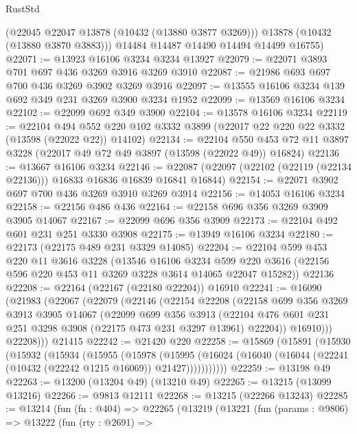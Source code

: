 \begin{lexlean}{RustStd}
\begin{coremodule}
        (@22045 @22047 @13878 (@10432 (@13880 @3877 @3269)))
        @13878
        (@10432 (@13880 @3870 @3883)))
      @14484
      @14487
      @14490
      @14494
      @14499
      @16755)
@22071 := @13923 @16106 @3234 @3234 @13927
@22079 := @22071 @3893 @701 @697 @436 @3269 @3916 @3269 @3910
@22087 := @21986 @693 @697 @700 @436 @3269 @3902 @3269 @3916
@22097 := @13555 @16106 @3234 @139 @692 @349 @231 @3269 @3900 @3234 @1952
@22099 := @13569 @16106 @3234
@22102 := @22099 @692 @349 @3900
@22104 := @13578 @16106 @3234
@22119 := @22104
    @494
    @552
    @220
    @102
    @3332
    @3899
    (@22017 @22 @220 @22 @3332 (@13598 (@22022 @22)) @14102)
@22134 := @22104
    @550
    @453
    @72
    @11
    @3897
    @3228
    (@22017 @49 @72 @49 @3897 (@13598 (@22022 @49)) @16824)
@22136 := @13667 @16106 @3234
@22146 := @22087 (@22097 (@22102 (@22119 (@22134 @22136))) @16833 @16836 @16839 @16841 @16844)
@22154 := @22071 @3902 @697 @700 @436 @3269 @3910 @3269 @3914
@22156 := @14053 @16106 @3234
@22158 := @22156 @486 @436
@22164 := @22158 @696 @356 @3269 @3909 @3905 @14067
@22167 := @22099 @696 @356 @3909
@22173 := @22104 @492 @601 @231 @251 @3330 @3908
@22175 := @13949 @16106 @3234
@22180 := @22173 (@22175 @489 @231 @3329 @14085)
@22204 := @22104
    @599
    @453
    @220
    @11
    @3616
    @3228
    (@13546
      @16106
      @3234
      @599
      @220
      @3616
      (@22156 @596 @220 @453 @11 @3269 @3228 @3614 @14065 @22047 @15282))
    @22136
@22208 := @22164 (@22167 (@22180 @22204)) @16910
@22241 := @16090
    (@21983
      (@22067
        (@22079
          (@22146
            (@22154
              @22208
              (@22158
                @699
                @356
                @3269
                @3913
                @3905
                @14067
                (@22099
                  @699
                  @356
                  @3913
                  (@22104 @476 @601 @231 @251 @3298 @3908 (@22175 @473 @231 @3297 @13961) @22204))
                @16910)))
          @22208)))
    @21415
@22242 := @21420 @220
@22258 := @15869
    (@15891
      (@15930
        (@15932
          (@15934
            (@15955
              (@15978
                (@15995
                  (@16024 (@16040 (@16044 (@22241 (@10432 (@22242 @1215 @16069)) @21427)))))))))))
@22259 := @13198 @49
@22263 := @13200 (@13204 @49) (@13210 @49)
@22265 := @13215 (@13099 @13216)
@22266 := @9813 @12111
@22268 := @13215 (@22266 @13243)
@22285 := @13214
    (fun (fn : @404) =>
    @22265
      (@13219
        (@13221
          (fun (params : @9806) =>
          @13222
            (fun (rty : @2691) =>

\end{coremodule}
\end{lexlean}

